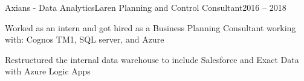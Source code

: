 \resumeSubheading
  {Axians - Data Analytics}{Laren}
  {Planning and Control Consultant}{2016 – 2018}
  \vspace{\experienceItemSpacing}
  \resumeItemListStart
\item Worked as an intern and got hired as a Business Planning Consultant working with: Cognos TM1, SQL server, and Azure
\item Restructured the internal data warehouse to include Salesforce and Exact Data with Azure Logic Apps
  \resumeItemListEnd 